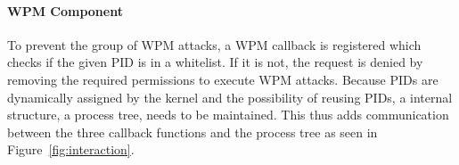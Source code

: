 \paragraph{WPM Component}
To prevent the group of \gls{WPM} attacks, a \gls{WPM} callback is registered which checks if the given \gls{PID} is in a whitelist. If it is not, the request is denied by removing the required permissions to execute \gls{WPM} attacks. Because \glspl{PID} are dynamically assigned by the kernel and the possibility of reusing \glspl{PID}, a internal structure, a process tree, needs to be maintained. This thus adds communication between the three callback functions and the process tree as seen in Figure~\ref{fig:interaction}.